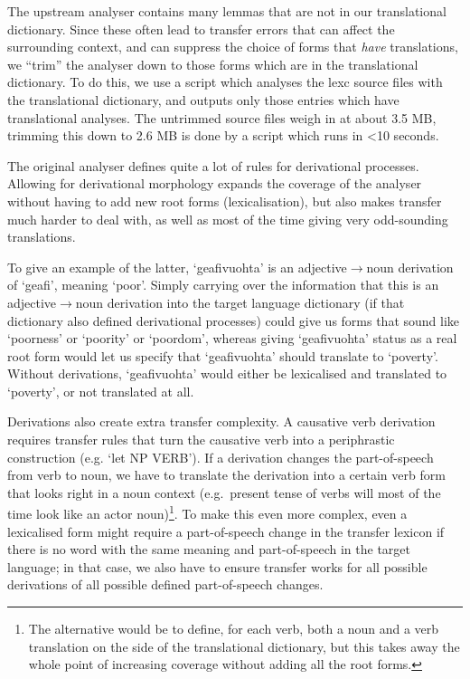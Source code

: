 The upstream analyser contains many lemmas that are not in our
translational dictionary. Since these often lead to transfer errors
that can affect the surrounding context, and can suppress the choice
of forms that \textit{have} translations, we ``trim'' the analyser
down to those forms which are in the translational dictionary. To do
this, we use a script which analyses the lexc source files with the
translational dictionary, and outputs only those entries which have
translational analyses. The untrimmed source files weigh in at about
3.5 MB, trimming this down to 2.6 MB is done by a script which runs in
<10 seconds.

The original analyser defines quite a lot of rules for derivational
processes. Allowing for derivational morphology expands the coverage
of the analyser without having to add new root forms (lexicalisation),
but also makes transfer much harder to deal with, as well as most of
the time giving very odd-sounding translations.

To give an example of the latter, `geafivuohta' is an
adjective$\rightarrow{}$noun derivation of `geafi', meaning `poor'.
Simply carrying over the information that this is an
adjective$\rightarrow{}$noun derivation into the target language
dictionary (if that dictionary also defined derivational processes)
could give us forms that sound like `poorness' or `poority' or
`poordom', whereas giving `geafivuohta' status as a real root form
would let us specify that `geafivuohta' should translate to `poverty'.
Without derivations, `geafivuohta' would either be lexicalised and
translated to `poverty', or not translated at all.

Derivations also create extra transfer complexity. A causative verb
derivation requires transfer rules that turn the causative verb into a
periphrastic construction (e.g. `let NP VERB'). If a derivation
changes the part-of-speech from verb to noun, we have to translate the
derivation into a certain verb form that looks right in a noun context
(e.g.~present tense of \nob verbs will most of the time look like an
actor noun)\footnote{The alternative would be to define, for each \sme
  verb, both a noun and a verb translation on the \nob side of the
  translational dictionary, but this takes away the whole point of
  increasing coverage without adding all the root forms.}. To make
this even more complex, even a lexicalised form might require a
part-of-speech change in the transfer lexicon if there is no word with
the same meaning and part-of-speech in the target language; in that
case, we also have to ensure transfer works for all possible
derivations of all possible defined part-of-speech changes.

